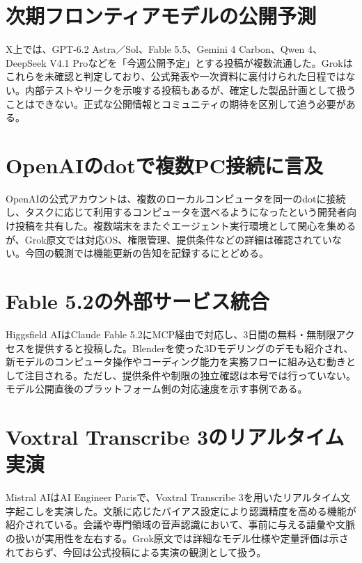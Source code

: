 \section{次期フロンティアモデルの公開予測}
X上では、GPT-6.2 Astra／Sol、Fable 5.5、Gemini 4 Carbon、Qwen 4、DeepSeek V4.1 Proなどを「今週公開予定」とする投稿が複数流通した。Grokはこれらを未確認と判定しており、公式発表や一次資料に裏付けられた日程ではない。内部テストやリークを示唆する投稿もあるが、確定した製品計画として扱うことはできない。正式な公開情報とコミュニティの期待を区別して追う必要がある。

\section{OpenAIのdotで複数PC接続に言及}
OpenAIの公式アカウントは、複数のローカルコンピュータを同一のdotに接続し、タスクに応じて利用するコンピュータを選べるようになったという開発者向け投稿を共有した。複数端末をまたぐエージェント実行環境として関心を集めるが、Grok原文では対応OS、権限管理、提供条件などの詳細は確認されていない。今回の観測では機能更新の告知を記録するにとどめる。

\section{Fable 5.2の外部サービス統合}
Higgsfield AIはClaude Fable 5.2にMCP経由で対応し、3日間の無料・無制限アクセスを提供すると投稿した。Blenderを使った3Dモデリングのデモも紹介され、新モデルのコンピュータ操作やコーディング能力を実務フローに組み込む動きとして注目される。ただし、提供条件や制限の独立確認は本号では行っていない。モデル公開直後のプラットフォーム側の対応速度を示す事例である。

\section{Voxtral Transcribe 3のリアルタイム実演}
Mistral AIはAI Engineer Parisで、Voxtral Transcribe 3を用いたリアルタイム文字起こしを実演した。文脈に応じたバイアス設定により認識精度を高める機能が紹介されている。会議や専門領域の音声認識において、事前に与える語彙や文脈の扱いが実用性を左右する。Grok原文では詳細なモデル仕様や定量評価は示されておらず、今回は公式投稿による実演の観測として扱う。
